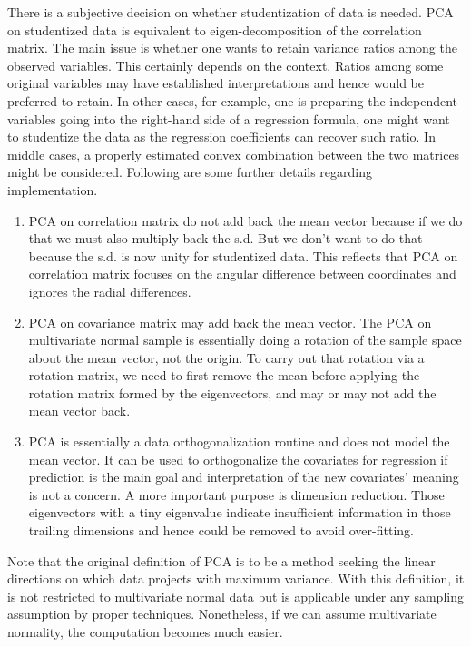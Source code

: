 \documentclass[article]{jss}
\begin{document}
        There is a subjective decision on whether studentization of data is needed. PCA on studentized data is equivalent to eigen-decomposition of the correlation matrix. The main issue is whether one wants to retain variance ratios among the observed variables. This certainly depends on the context. Ratios among some original variables may have established interpretations and hence would be preferred to retain. In other cases, for example, one is preparing the independent variables going into the right-hand side of a regression formula, one might want to studentize the data as the regression coefficients can recover such ratio. In middle cases, a properly estimated convex combination between the two matrices might be considered.
        Following are some further details regarding implementation.
        \begin{enumerate}
        	\item PCA on correlation matrix do not add back the mean vector because if we do that we must also multiply back the s.d. But we don't want to do that because the s.d. is now unity for studentized data. This reflects that PCA on correlation matrix focuses on the angular difference between coordinates and ignores the radial differences.
        	\item PCA on covariance matrix may add back the mean vector. The PCA on multivariate normal sample is essentially doing a rotation of the sample space about the mean vector, not the origin. To carry out that rotation via a rotation matrix, we need to first remove the mean before applying the rotation matrix formed by the eigenvectors, and may or may not add the mean vector back.
        	\item PCA is essentially a data orthogonalization routine and does not model the mean vector. It can be used to orthogonalize the covariates for regression if prediction is the main goal and interpretation of the new covariates' meaning is not a concern. A more important purpose is dimension reduction. Those eigenvectors with a tiny eigenvalue indicate insufficient information in those trailing dimensions and hence could be removed to avoid over-fitting.
        \end{enumerate}
        Note that the original definition of PCA is to be a method seeking the linear directions on which data projects with maximum variance. With this definition, it is not restricted to multivariate normal data but is applicable under any sampling assumption by proper techniques. Nonetheless, if we can assume multivariate normality, the computation becomes much easier.
        
\end{document}
